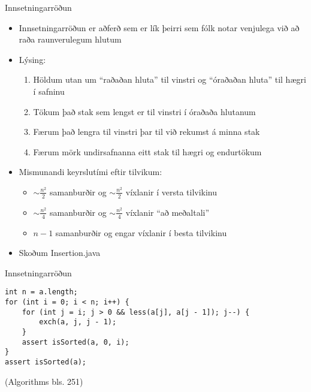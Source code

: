 \documentclass{beamer}
\begin{document}
\begin{frame}{Innsetningarröðun}
	\begin{itemize}
		\item Innsetningarröðun  er aðferð sem er lík þeirri sem fólk notar venjulega við að raða raunverulegum hlutum
		\item Lýsing:
		      \begin{enumerate}
			      \item Höldum utan um ``raðaðan hluta'' til vinstri og ``óraðaðan hluta'' til hægri í safninu
			      \item Tökum það stak sem lengst er til vinstri í óraðaða hlutanum
			      \item Færum það lengra til vinstri þar til við rekumst á minna stak
			      \item Færum mörk undirsafnanna eitt stak til hægri og endurtökum
		      \end{enumerate}
		\item Mismunandi keyrslutími eftir tilvikum:
		      \begin{itemize}
			      \item $\sim \frac{n^2}{2}$ samanburðir og $\sim \frac{n^2}{2}$ víxlanir í versta tilvikinu
			      \item $\sim \frac{n^2}{4}$ samanburðir og $\sim \frac{n^2}{4}$ víxlanir ``að meðaltali''
			      \item $n-1$ samanburðir og engar víxlanir í besta tilvikinu
		      \end{itemize}
		\item Skoðum Insertion.java
	\end{itemize}
\end{frame}

\begin{frame}[fragile]{Innsetningarröðun}
	\begin{verbatim}
int n = a.length;
for (int i = 0; i < n; i++) {
    for (int j = i; j > 0 && less(a[j], a[j - 1]); j--) {
        exch(a, j, j - 1);
    }
    assert isSorted(a, 0, i);
}
assert isSorted(a);
    \end{verbatim}
	(Algorithms bls. 251)
\end{frame}
\end{document}

